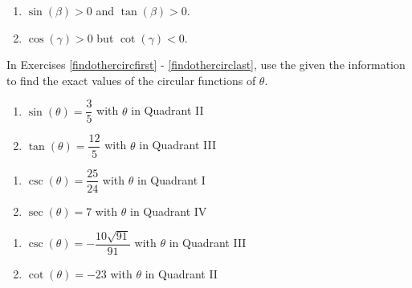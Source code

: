\begin{multicols}{2}
\begin{enumerate}
\setcounter{enumi}{\value{HW}}

\item  $\sin(\beta) > 0$ and $\tan(\beta) > 0$.

\item  \label{whereisanglelast} $\cos(\gamma) > 0$ but $\cot(\gamma) < 0$.

\setcounter{HW}{\value{enumi}}
\end{enumerate}
\end{multicols}


In Exercises \ref{findothercircfirst} - \ref{findothercirclast}, use the given the information to find the exact values of the circular functions of $\theta$.

\begin{multicols}{2}

\begin{enumerate}

\setcounter{enumi}{\value{HW}}

\item $\sin(\theta) = \dfrac{3}{5}$ with $\theta$ in Quadrant II \label{findothercircfirst}
\item $\tan(\theta) = \dfrac{12}{5}$ with $\theta$ in Quadrant III

\setcounter{HW}{\value{enumi}}

\end{enumerate}

\end{multicols}

\begin{multicols}{2}

\begin{enumerate}

\setcounter{enumi}{\value{HW}}

\item $\csc(\theta) = \dfrac{25}{24}$ with $\theta$ in Quadrant I
\item $\sec(\theta) = 7$ with $\theta$ in Quadrant IV 

\setcounter{HW}{\value{enumi}}

\end{enumerate}

\end{multicols}

\begin{multicols}{2}

\begin{enumerate}

\setcounter{enumi}{\value{HW}}

\item $\csc(\theta) = -\dfrac{10\sqrt{91}}{91}$ with $\theta$ in Quadrant III
\item $\cot(\theta) = -23$ with $\theta$ in Quadrant II 

\setcounter{HW}{\value{enumi}}

\end{enumerate}

\end{multicols}


